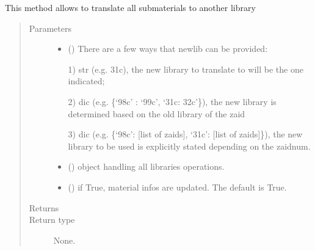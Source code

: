 \documentclass[letterpaper,10pt,english]{sphinxmanual}
\begin{document}
\begin{fulllineitems}
\begin{fulllineitems}
\label{\detokenize{api/inputgeneration:matreader.Material.translate}}
This method allows to translate all submaterials to another library
\begin{quote}\begin{description}
\item[{Parameters}] \leavevmode\begin{itemize}
\item {} 
 () \textendash{} 
There are a few ways that newlib can be provided:

1) str (e.g. 31c), the new library to translate to will be the
one indicated;

2) dic (e.g. \{‘98c’ : ‘99c’, ‘31c: 32c’\}), the new library is
determined based on the old library of the zaid

3) dic (e.g. \{‘98c’: {[}list of zaids{]}, ‘31c’: {[}list of zaids{]}\}),
the new library to be used is explicitly stated depending
on the zaidnum.


\item {} 
 ({\hyperref[\detokenize{api/initobjects:libmanager.LibManager}]{}}) \textendash{} object handling all libraries operations.

\item {} 
 (\sphinxstyleliteralemphasis{\sphinxupquote{, }}) \textendash{} if True, material infos are updated. The default is True.

\end{itemize}

\item[{Returns}] \leavevmode


\item[{Return type}] \leavevmode
None.

\end{description}\end{quote}


\end{fulllineitems}
\end{fulllineitems}
\end{document}
